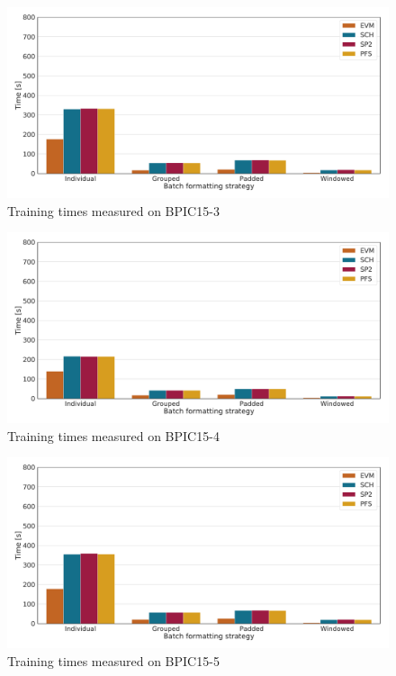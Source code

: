 \begin{figure}
    \centering
    \includegraphics[width=\textwidth]{gfx/bpic2015_3/train_timings.pdf}
    \caption{Training times measured on BPIC15-3}
    \label{fig:BPIC15-3-training-timings}
\end{figure}
\begin{figure}
    \centering
    \includegraphics[width=\textwidth]{gfx/bpic2015_4/train_timings.pdf}
    \caption{Training times measured on BPIC15-4}
    \label{fig:BPIC15-4-training-timings}
\end{figure}
\begin{figure}
    \centering
    \includegraphics[width=\textwidth]{gfx/bpic2015_5/train_timings.pdf}
    \caption{Training times measured on BPIC15-5}
    \label{fig:BPIC15-5-training-timings}
\end{figure}
\FloatBarrier

